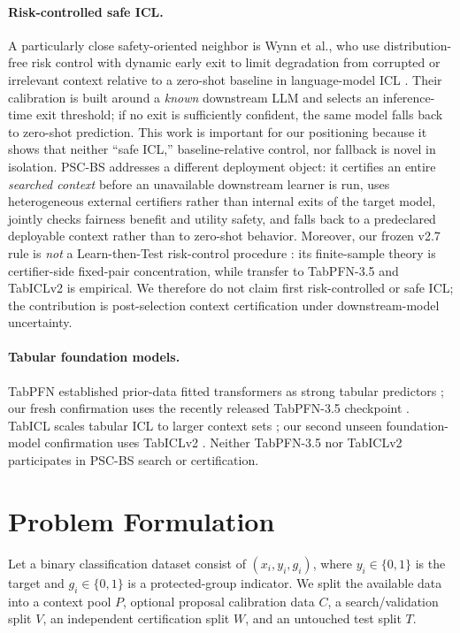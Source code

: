 \documentclass[10pt]{article}
\newcommand{\PSC}{\textsc{PSC-BS}}
\begin{document}
\paragraph{Risk-controlled safe ICL.}
A particularly close safety-oriented neighbor is Wynn et al., who use distribution-free risk control with dynamic early exit to limit degradation from corrupted or irrelevant context relative to a zero-shot baseline in language-model ICL \citep{wynn2026corrupted}.
Their calibration is built around a \emph{known} downstream LLM and selects an inference-time exit threshold; if no exit is sufficiently confident, the same model falls back to zero-shot prediction.
This work is important for our positioning because it shows that neither ``safe ICL,'' baseline-relative control, nor fallback is novel in isolation.
\PSC{} addresses a different deployment object: it certifies an entire \emph{searched context} before an unavailable downstream learner is run, uses heterogeneous external certifiers rather than internal exits of the target model, jointly checks fairness benefit and utility safety, and falls back to a predeclared deployable context rather than to zero-shot behavior.
Moreover, our frozen v2.7 rule is \emph{not} a Learn-then-Test risk-control procedure \citep{angelopoulos2025ltt}: its finite-sample theory is certifier-side fixed-pair concentration, while transfer to TabPFN-3.5 and TabICLv2 is empirical.
We therefore do not claim first risk-controlled or safe ICL; the contribution is post-selection context certification under downstream-model uncertainty.

\paragraph{Tabular foundation models.}
TabPFN established prior-data fitted transformers as strong tabular predictors \citep{hollmann2025tabpfn}; our fresh confirmation uses the recently released TabPFN-3.5 checkpoint \citep{jaeger2026tabpfn35}.
TabICL scales tabular ICL to larger context sets \citep{qu2025tabicl}; our second unseen foundation-model confirmation uses TabICLv2 \citep{qu2026tabiclv2}.
Neither TabPFN-3.5 nor TabICLv2 participates in \PSC{} search or certification.

\section{Problem Formulation}

Let a binary classification dataset consist of $(x_i,y_i,g_i)$, where $y_i\in\{0,1\}$ is the target and $g_i\in\{0,1\}$ is a protected-group indicator.
We split the available data into a context pool $P$, optional proposal calibration data $C$, a search/validation split $V$, an independent certification split $W$, and an untouched test split $T$.
\end{document}
